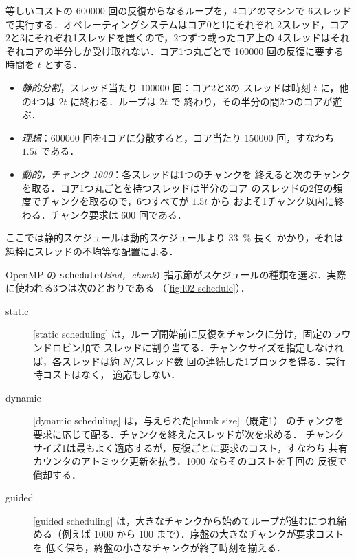 \documentclass[../main.tex]{subfiles}
\begin{document}
\begin{example}[進み方の不揃いなスレッド]
  \label{ex:l02-schedule}
  等しいコストの \num{600000} 回の反復からなるループを，4コアのマシンで
  6スレッドで実行する．オペレーティングシステムはコア0と1にそれぞれ
  2スレッド，コア2と3にそれぞれ1スレッドを置くので，2つずつ載ったコア上の
  4スレッドはそれぞれコアの半分しか受け取れない．コア1つ丸ごとで
  \num{100000} 回の反復に要する時間を $t$ とする．
  \begin{itemize}
    \item \emph{静的分割}，スレッド当たり \num{100000} 回：コア2と3の
      スレッドは時刻 $t$ に，他の4つは $2t$ に終わる．ループは $2t$ で
      終わり，その半分の間2つのコアが遊ぶ．
    \item \emph{理想}：\num{600000} 回を4コアに分散すると，コア当たり
      \num{150000} 回，すなわち $1.5t$ である．
    \item \emph{動的，チャンク \num{1000}}：各スレッドは1つのチャンクを
      終えると次のチャンクを取る．コア1つ丸ごとを持つスレッドは半分のコア
      のスレッドの2倍の頻度でチャンクを取るので，6つすべてが $1.5t$ から
      およそ1チャンク以内に終わる．チャンク要求は \num{600} 回である．
  \end{itemize}
  ここでは静的スケジュールは動的スケジュールより \SI{33}{\percent} 長く
  かかり，それは純粋にスレッドの不均等な配置による．
\end{example}

OpenMP の \texttt{schedule(}\textit{kind}\texttt{, }\textit{chunk}\texttt{)}
指示節がスケジュールの種類を選ぶ．実際に使われる3つは次のとおりである
（\cref{fig:l02-schedule}）．
\begin{description}
  \item[static]  [static scheduling]
    は，ループ開始前に反復をチャンクに分け，固定のラウンドロビン順で
    スレッドに割り当てる．チャンクサイズを指定しなければ，各スレッドは約
    $N/\text{スレッド数}$ 回の連続した1ブロックを得る．実行時コストはなく，
    適応もしない．
  \item[dynamic]  [dynamic scheduling]
    は，与えられた[chunk size]（既定1）
    のチャンクを要求に応じて配る．チャンクを終えたスレッドが次を求める．
    チャンクサイズ1は最もよく適応するが，反復ごとに要求のコスト，すなわち
    共有カウンタのアトミック更新を払う．\num{1000} ならそのコストを千回の
    反復で償却する．
  \item[guided]  [guided scheduling]
    は，大きなチャンクから始めてループが進むにつれ縮める（例えば
    \num{1000} から \num{100} まで）．序盤の大きなチャンクが要求コストを
    低く保ち，終盤の小さなチャンクが終了時刻を揃える．
\end{description}
\end{document}
